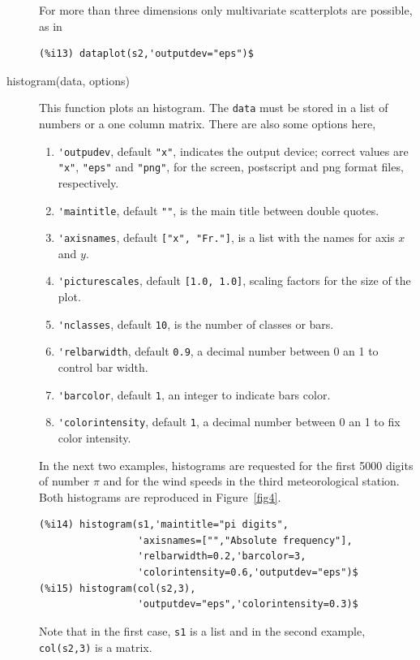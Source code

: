 \documentclass[12pt,a4paper]{article}
\begin{document}
\begin{description}
For more than three dimensions only multivariate scatterplots are possible, as in
\begin{verbatim}
(%i13) dataplot(s2,'outputdev="eps")$
\end{verbatim}


\item[histogram(data, options)] This function plots an histogram. The \verb|data| must be stored in a list of numbers or a one column matrix. There are also some options here,

\begin{enumerate}
\item \verb|'outpudev|, default \verb|"x"|, indicates the output device; correct values are \verb|"x"|, \verb|"eps"| and \verb|"png"|, for the screen, postscript and png format files, respectively.
\item \verb|'maintitle|, default \verb|""|, is the main title between double quotes.
\item \verb|'axisnames|, default \verb|["x", "Fr."]|, is a list with the names for axis $x$ and $y$.
\item \verb|'picturescales|, default \verb|[1.0, 1.0]|, scaling factors for the size of the plot.
\item \verb|'nclasses|, default \verb|10|, is the number of classes or bars.
\item \verb|'relbarwidth|, default \verb|0.9|, a decimal number between 0 an 1 to control bar width.
\item \verb|'barcolor|, default \verb|1|, an integer to indicate bars color.
\item \verb|'colorintensity|, default \verb|1|, a decimal number between 0 an 1 to fix color intensity.
\end{enumerate}

In the next two examples, histograms are requested for the first 5000 digits of number $\pi$ and for the wind speeds in the third meteorological station. Both histograms are reproduced in Figure~\ref{fig4}.
\begin{verbatim}
(%i14) histogram(s1,'maintitle="pi digits",
                 'axisnames=["","Absolute frequency"],
                 'relbarwidth=0.2,'barcolor=3,
                 'colorintensity=0.6,'outputdev="eps")$
(%i15) histogram(col(s2,3),
                 'outputdev="eps",'colorintensity=0.3)$
\end{verbatim}
Note that in the first case, \verb|s1| is a list and in the second example, \verb|col(s2,3)| is a matrix.


\end{description}
\end{document}

